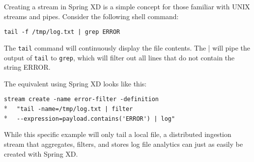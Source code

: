 Creating a stream in Spring XD is a simple concept for those familiar with
UNIX streams and pipes. Consider the following shell command:

\verb;tail -f /tmp/log.txt | grep ERROR;

The \texttt{tail} command will continuously display the file contents. The |
will pipe the output of \texttt{tail} to \texttt{grep}, which will filter 
out all lines that do not contain the string ERROR.

The equivalent using Spring XD looks like this:

\verb;stream create -name error-filter -definition;\\*
\verb;  "tail -name=/tmp/log.txt | filter;\\*
\verb;  --expression=payload.contains('ERROR') | log";

While this specific example will only tail a local file, a distributed 
ingestion stream that aggregates, filters, and stores log file analytics
can just as easily be created with Spring XD.
